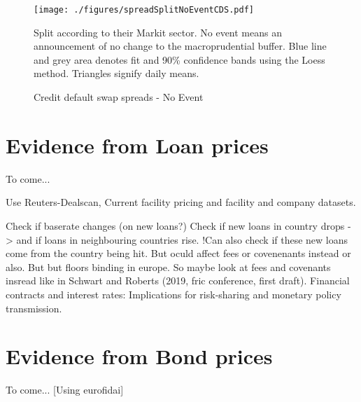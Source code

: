 \documentclass[11pt]{article}
\newcommand\fnote[1]{\captionsetup{font=small}\caption*{#1}}
\begin{document}
\begin{figure}%
	\centering
	\texttt{[image: ./figures/spreadSplitNoEventCDS.pdf]}
	\caption{Credit default swap spreads - No Event}
	\label{fig:eventCDSSplitNoEvent}
	\fnote{Split according to their Markit sector. No event means an announcement of no change to the macroprudential buffer. Blue line and grey area denotes fit and 90\% confidence bands using the Loess method. Triangles signify daily means.}
\end{figure}

\section{Evidence from Loan prices}
To come...

Use Reuters-Dealscan, Current facility pricing and facility and company datasets.

Check if baserate changes (on new loans?)
Check if new loans in country drops -> and if loans in neighbouring countries rise. !Can also check if these new loans come from the country being hit.
But oculd affect fees or covenenants instead or also.
But but floors binding in europe. So maybe look at fees and covenants insread like in Schwart and Roberts (2019, fric conference, first draft). Financial contracts and interest rates: Implications for risk-sharing and monetary policy transmission. 

\section{Evidence from Bond prices}
To come...
[Using eurofidai]



\clearpage

\end{document}
